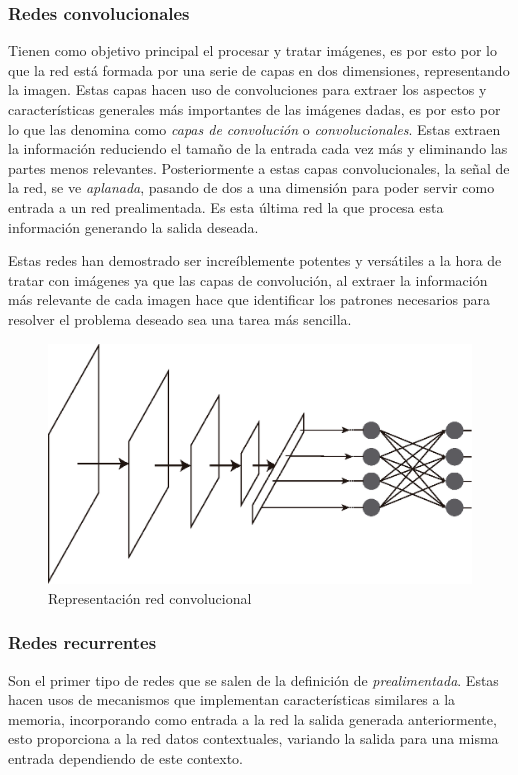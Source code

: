 \subsubsection{Redes convolucionales}
Tienen como objetivo principal el procesar y tratar imágenes, es por esto por lo
que la red está formada por una serie de capas en dos dimensiones, representando
la imagen. Estas capas hacen uso de convoluciones para extraer los aspectos y
características generales más importantes de las imágenes dadas, es por esto por
lo que las denomina como \textit{capas de convolución} o
\textit{convolucionales}. Estas extraen la información reduciendo el tamaño de
la entrada cada vez más y eliminando las partes menos relevantes.
Posteriormente a estas capas convolucionales, la señal de la red, se ve
\textit{aplanada}, pasando de dos a una dimensión para poder servir como entrada
a un red prealimentada. Es esta última red la que procesa esta información
generando la salida deseada. 

Estas redes han demostrado ser increíblemente potentes y versátiles a la hora de
tratar con imágenes ya que las capas de convolución, al extraer la información
más relevante de cada imagen hace que identificar los patrones necesarios para
resolver el problema deseado sea una tarea más sencilla.

\begin{figure}[H]
	\includegraphics[scale=0.7]{imagenes/DIagramaRedConvolucional.eps}
	\centering
	\captionsetup{justification=centering}
    \caption{Representación red convolucional}
    \label{Representación red convolucional}
\end{figure}


\subsubsection{Redes recurrentes}
Son el primer tipo de redes que se salen de la definición de \textit{prealimentada}. Estas hacen usos de mecanismos que implementan características
similares a la memoria, incorporando como entrada a la red la salida generada
anteriormente, esto proporciona a la red datos contextuales, variando la salida
para una misma entrada dependiendo de este contexto.

